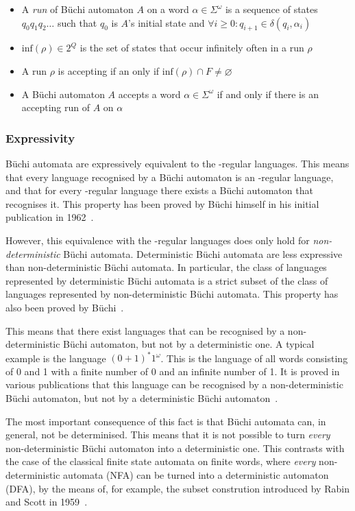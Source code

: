 \begin{itemize}
\item A \emph{run} of Büchi automaton $A$ on a word $\alpha \in \Sigma^\omega$ is a sequence of states $q_0q_1q_2\dots$ such that $q_0$ is $A$'s initial state and $\forall i \geq 0: q_{i+1} \in \delta(q_i, \alpha_i)$
\item $\textrm{inf}(\rho) \in 2^Q$ is the set of states that occur infinitely often in a run $\rho$
\item A run $\rho$ is accepting if an only if $\textrm{inf}(\rho) \cap F \neq \varnothing$
\item A Büchi automaton $A$ accepts a word $\alpha \in \Sigma^\omega$ if and only if there is an accepting run of $A$ on $\alpha$
\end{itemize}


\subsubsection{Expressivity}
Büchi automata are expressively equivalent to the \om-regular languages. This means that every language recognised by a Büchi automaton is an \om-regular language, and that for every \om-regular language there exists a Büchi automaton that recognises it. This property has been proved by Büchi himself in his initial publication in 1962~\cite{buchi1960decision}.

However, this equivalence with the \om-regular languages does only hold for \textit{non-deterministic} Büchi automata. Deterministic Büchi automata are less expressive than non-deterministic Büchi automata. In particular, the class of languages represented by deterministic Büchi automata is a strict subset of the class of languages represented by non-deterministic Büchi automata. This property has also been proved by Büchi~\cite{buchi1960decision}.

This means that there exist languages that can be recognised by a non-deterministic Büchi automaton, but not by a deterministic one. A typical example is the language $(0+1)^*1^\omega$. This is the language of all words consisting of 0 and 1 with a finite number of 0 and an infinite number of 1. It is proved in various publications that this language can be recognised by a non-deterministic Büchi automaton, but not by a deterministic Büchi automaton~\cite{1996_vardi}\cite{2002_roggenbach}.

The most important consequence of this fact is that Büchi automata can, in general, not be determinised. This means that it is not possible to turn \textit{every} non-deterministic Büchi automaton into a deterministic one. This contrasts with the case of the classical finite state automata on finite words, where \textit{every} non-deterministic automata (NFA) can be turned into a deterministic automaton (DFA), by the means of, for example, the subset constrution introduced by Rabin and Scott in 1959~\cite{1959_rabin}.

